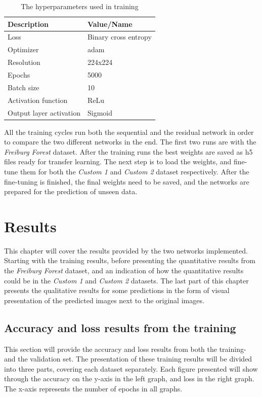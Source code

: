 \documentclass[USenglish]{ifimaster}  %
\begin{document}
\begin{table}[ht]
\centering
\begin{tabular}{ll}
\hline
\textbf{Description} & \textbf{Value/Name}  \\ \hline
Loss &  Binary cross entropy\\
Optimizer &  adam \\
Resolution & 224x224 \\
Epochs &  5000 \\ 
Batch size & 10\\
Activation function & ReLu\\
Output layer activation & Sigmoid \\ \hline
\end{tabular}
\caption{The hyperparameters used in training}
\label{table:hyperparameters}
\end{table}

All the training cycles run both the sequential and the residual network in order to compare the two different networks in the end. The first two runs are with the \textit{Freiburg Forest} dataset. After the training runs the best weights are saved as h5 files ready for transfer learning. The next step is to load the weights, and fine-tune them for both the \textit{Custom 1} and \textit{Custom 2} dataset respectively. After the fine-tuning is finished, the final weights need to be saved, and the networks are prepared for the prediction of unseen data. 

\chapter{Results}\label{result} 
This chapter will cover the results provided by the two networks implemented. Starting with the training results, before presenting the quantitative results from the \textit{Freiburg Forest} dataset, and an indication of how the quantitative results could be in the \textit{Custom 1} and \textit{Custom 2} datasets. The last part of this chapter presents the qualitative results for some predictions in the form of visual presentation of the predicted images next to the original images.

\section{Accuracy and loss results from the training}
This section will provide the accuracy and loss results from both the training- and the validation set. The presentation of these training results will be divided into three parts, covering each dataset separately. Each figure presented will show through the accuracy on the y-axis in the left graph, and loss in the right graph. The x-axis represents the number of epochs \cite{website:epoch} in all graphs.  
\end{document}
